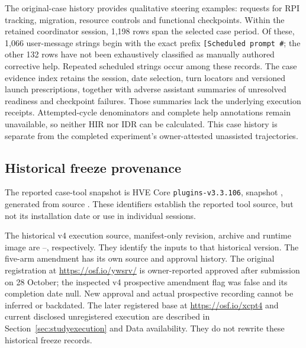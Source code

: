 The original-case history provides qualitative steering examples: requests
for RPI tracking, migration, resource controls and functional checkpoints.
Within the retained coordinator session, 1,198 rows span the selected case
period. Of these, 1,066 user-message strings begin with the exact prefix
\texttt{[Scheduled prompt \#}; the other 132 rows have not been exhaustively
classified as manually authored corrective help. Repeated scheduled strings
occur among these records. The case evidence index retains the session,
date selection, turn locators and versioned launch prescriptions, together
with adverse assistant summaries of unresolved readiness and checkpoint
failures. Those summaries lack the underlying execution receipts.
Attempted-cycle denominators and complete help annotations remain
unavailable, so neither HIR nor IDR can be calculated. This case history is
separate from the completed experiment's owner-attested unassisted
trajectories.

\subsection{Historical freeze provenance}\label{app:freezeprovenance}

The reported case-tool snapshot is HVE Core \texttt{plugins-v3.3.106},
snapshot , generated from source .
These identifiers establish the reported tool source, but not its
installation date or use in individual sessions.

The historical v4 execution source, manifest-only revision, archive and
runtime image are --, respectively.
They identify the inputs to that historical version. The five-arm
amendment has its own source and approval history. The original registration at
\url{https://osf.io/ywsrv/} is owner-reported approved after submission
on 28 October; the inspected v4 prospective amendment flag was false
and its completion date null. New approval and actual prospective
recording cannot be inferred or backdated.
The later registered base at \url{https://osf.io/xcpt4} and current disclosed
unregistered execution are described in Section~\ref{sec:studyexecution}
and Data availability. They do not rewrite these historical freeze records.
